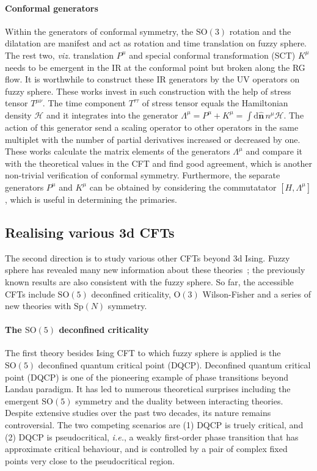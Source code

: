\documentclass{timesjhep}
\begin{document}
\paragraph{Conformal generators~\cite{Fardelli2024,Fan2024}}

Within the generators of conformal symmetry, the $\mathrm{SO}(3)$ rotation and the dilatation are manifest and act as rotation and time translation on fuzzy sphere. The rest two, \textit{viz.} translation $P^\mu$ and special conformal transformation (SCT) $K^\mu$ needs to be emergent in the IR at the conformal point but broken along the RG flow. It is worthwhile to construct these IR generators by the UV operators on fuzzy sphere. These works invest in such construction with the help of stress tensor $T^{\mu\nu}$. The time component $T^{\tau\tau}$ of stress tensor equals the Hamiltonian density $\mathscr{H}$ and it integrates into the generator $\Lambda^\mu=P^\mu+K^\mu=\int\mathrm{d}\hat{\mathbf{n}}\,n^\mu\mathscr{H}$. The action of this generator send a scaling operator to other operators in the same multiplet with the number of partial derivatives increased or decreased by one. These works calculate the matrix elements of the generators $\Lambda^\mu$ and compare it with the theoretical values in the CFT and find good agreement, which is another non-trivial verification of conformal symmetry. Furthermore, the separate generators $P^\mu$ and $K^\mu$ can be obtained by considering the commutatator $[H,\Lambda^\mu]$, which is useful in determining the primaries. 

\subsection{Realising various 3d CFTs}

The second direction is to study various other CFTs beyond 3d Ising. Fuzzy sphere has revealed many new information about these theories~; the previously known results are also consistent with the fuzzy sphere. So far, the accessible CFTs include $\mathrm{SO}(5)$ deconfined criticality, $\mathrm{O}(3)$ Wilson-Fisher and a series of new theories with $\mathrm{Sp}(N)$ symmetry. 

\paragraph{The $\mathrm{SO}(5)$ deconfined criticality~\cite{Zhou2023}}

The first theory besides Ising CFT to which fuzzy sphere is applied is the $\mathrm{SO}(5)$ deconfined quantum critical point (DQCP). Deconfined quantum critical point (DQCP) is one of the pioneering example of phase transitions beyond Landau paradigm. It has led to numerous theoretical surprises including the emergent $\mathrm{SO}(5)$ symmetry and the duality between interacting theories. Despite extensive studies over the past two decades, its nature remains controversial. The two competing scenarios are (1) DQCP is truely critical, and (2) DQCP is pseudocritical, \textit{i.e.}, a weakly first-order phase transition that has approximate critical behaviour, and is controlled by a pair of complex fixed points very close to the pseudocritical region. 
\end{document}
